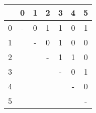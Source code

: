 \begin{tabular}{r|cccccc}
	&	0	&	1	&	2	&	3	&	4	&	5	\\
\hline
0	&	-	&	0	&	1	&	1	&	0	&	1	\\
1	&		&	-	&	0	&	1	&	0	&	0	\\
2	&		&		&	-	&	1	&	1	&	0	\\
3	&		&		&		&	-	&	0	&	1	\\
4	&		&		&		&		&	-	&	0	\\
5	&		&		&		&		&		&	-	\\
\end{tabular}
